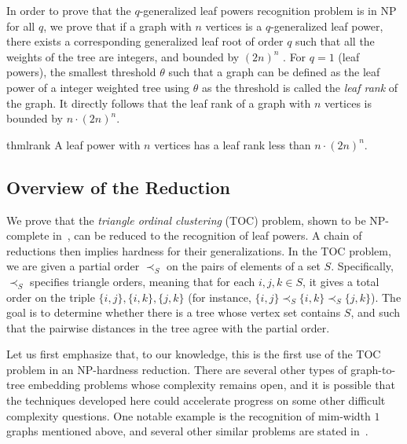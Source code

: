 \documentclass[11pt, letter]{article}
\theoremstyle{remark}
\begin{document}
In order to prove that the $q$-generalized leaf powers recognition problem is in NP for all $q$, we prove that if a graph with $n$ vertices is a $q$-generalized leaf power, there exists a corresponding generalized leaf root of order $q$ such that all the weights of the tree are integers, and bounded by $(2n)^n$ . For $q=1$ (leaf powers), the smallest threshold $\theta$ such that a graph can be defined as the leaf power of a integer weighted tree using $\theta$ as the threshold is called the \emph{leaf rank} of the graph. It directly follows that the leaf rank of a graph with $n$ vertices is bounded by $n \cdot (2n)^n$.

\begin{restatable}{thm}{lrank}
    A leaf power with $n$ vertices has a leaf rank less than $n \cdot (2n)^n$.
\end{restatable}



\subsection{Overview of the Reduction}

We prove that the \emph{triangle ordinal clustering} (TOC) problem, shown to be NP-complete in~\cite{SF06}, can be reduced to the recognition of leaf powers.  A chain of reductions then implies hardness for their generalizations.
In the TOC problem, we are given a partial order $\prec_S$ on the pairs of elements of a set $S$.  
Specifically, $\prec_S$ specifies triangle orders, meaning that for each $i, j, k \in S$, it gives a total order on the triple $\{i, j\}, \{i, k\}, \{j, k\}$ (for instance, $\{i, j\} \prec_S \{i, k\} \prec_S \{j, k\}$).  The goal is to determine whether there is a tree whose vertex set contains $S$, and such that the pairwise distances in the tree agree with the partial order. 

Let us first emphasize that, to our knowledge, this is the first use of the TOC problem in an NP-hardness reduction.  There are several other types of graph-to-tree embedding problems whose complexity remains open, and it is possible that the techniques developed here could  accelerate progress on some other difficult complexity questions.  One notable example is the recognition of mim-width $1$ graphs mentioned above, and several other similar problems are stated in~\cite{hogemo2025mapping}.
\end{document}
